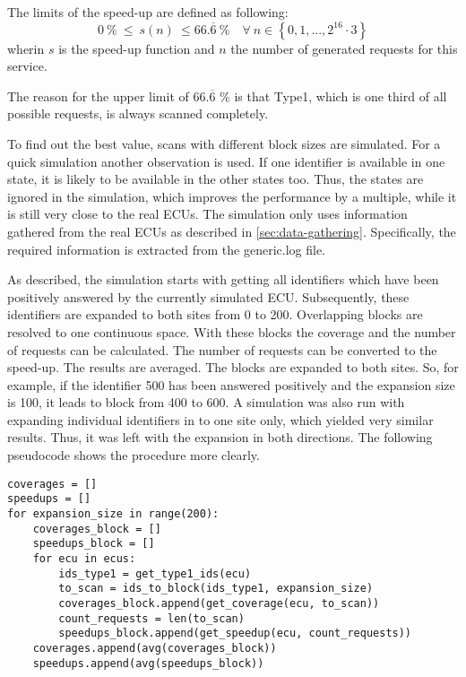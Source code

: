 The limits of the speed-up are defined as following:
\[ 0\ \% \ \leq\  s(n)\  \leq 66.\overline{6}\ \% \quad \forall \  n \in \left\{0, 1, ..., 2^{16} \cdot 3\right\} \]
wherin $s$ is the speed-up function and $n$ the number of generated requests for this service.

The reason for the upper limit of $66.\overline{6}$ \% is that Type1, which is one third of all possible requests, is always scanned completely.

To find out the best value, scans with different block sizes are simulated. For a quick simulation another observation is used. If one identifier is available in one state, it is likely to be available in the other states too. Thus, the states are ignored in the simulation, which improves the performance by a multiple, while it is still very close to the real ECUs. The simulation only uses information gathered from the real ECUs as described in \autoref{sec:data-gathering}. Specifically, the required information is extracted from the generic.log file.

As described, the simulation starts with getting all identifiers which have been positively answered by the currently simulated ECU. Subsequently, these identifiers are expanded to both sites from 0 to 200. Overlapping blocks are resolved to one continuous space. With these blocks the coverage and the number of requests can be calculated. The number of requests can be converted to the speed-up. The results are averaged.
The blocks are expanded to both sites. So, for example, if the identifier 500 has been answered positively and the expansion size is 100, it leads to block from 400 to 600. A simulation was also run with expanding individual identifiers in to one site only, which yielded very similar results. Thus, it was left with the expansion in both directions. 
The following pseudocode shows the procedure more clearly.

\begin{samepage}
\begin{verbatim}
coverages = []
speedups = []
for expansion_size in range(200):
    coverages_block = []
    speedups_block = []
    for ecu in ecus:
        ids_type1 = get_type1_ids(ecu)
        to_scan = ids_to_block(ids_type1, expansion_size)
        coverages_block.append(get_coverage(ecu, to_scan))
        count_requests = len(to_scan)
        speedups_block.append(get_speedup(ecu, count_requests))
    coverages.append(avg(coverages_block))
    speedups.append(avg(speedups_block))
\end{verbatim}
\end{samepage}

